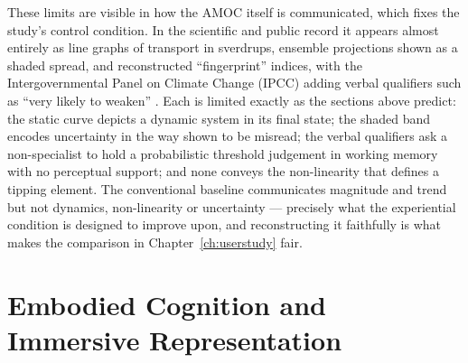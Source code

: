 These limits are visible in how the AMOC itself is communicated, which fixes the study's control condition. In the scientific and public record it appears almost entirely as line graphs of transport in sverdrups, ensemble projections shown as a shaded spread, and reconstructed ``fingerprint'' indices, with the Intergovernmental Panel on Climate Change (IPCC) adding verbal qualifiers such as ``very likely to weaken'' \citep{caesar2018, ipcc2021}. Each is limited exactly as the sections above predict: the static curve depicts a dynamic system in its final state; the shaded band encodes uncertainty in the way shown to be misread; the verbal qualifiers ask a non-specialist to hold a probabilistic threshold judgement in working memory with no perceptual support; and none conveys the non-linearity that defines a tipping element. The conventional baseline communicates magnitude and trend but not dynamics, non-linearity or uncertainty --- precisely what the experiential condition is designed to improve upon, and reconstructing it faithfully is what makes the comparison in Chapter~\ref{ch:userstudy} fair.

\section{Embodied Cognition and Immersive Representation}
\label{sec:embodied-viz}

